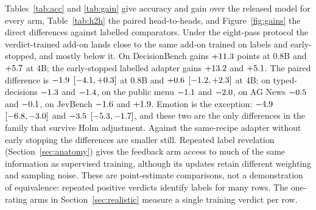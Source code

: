 Tables~\ref{tab:acc} and \ref{tab:gain} give accuracy and gain over the released model for every arm, Table~\ref{tab:h2h} the paired head-to-heads, and Figure~\ref{fig:gains} the direct differences against labelled comparators. Under the eight-pass protocol the verdict-trained add-on lands close to the same add-on trained on labels and early-stopped, and mostly below it. On DecisionBench \pk{} gains $+11.3$ points at 0.8B and $+5.7$ at 4B; the early-stopped labelled adapter gains $+13.2$ and $+5.1$. The paired difference is $-1.9$ $[-4.1, +0.3]$ at 0.8B and $+0.6$ $[-1.2, +2.3]$ at 4B; on typed-decisions $-1.3$ and $-1.4$, on the public menu $-1.1$ and $-2.0$, on AG News $-0.5$ and $-0.1$, on JevBench $-1.6$ and $+1.9$. Emotion is the exception: $-4.9$ $[-6.8, -3.0]$ and $-3.5$ $[-5.3, -1.7]$, and these two are the only differences in the family that survive Holm adjustment. Against the same-recipe adapter without early stopping the differences are smaller still. Repeated label revelation (Section~\ref{sec:anatomy}) gives the feedback arm access to much of the same information as supervised training, although its updates retain different weighting and sampling noise. These are point-estimate comparisons, not a demonstration of equivalence: repeated positive verdicts identify labels for many rows. The one-rating arms in Section~\ref{sec:realistic} measure a single training verdict per row.

